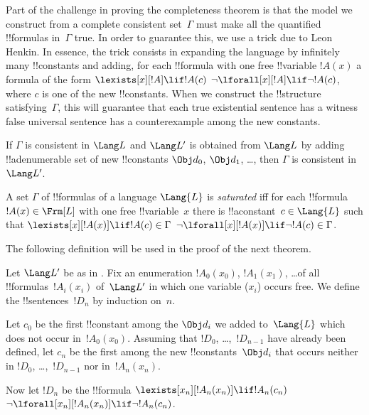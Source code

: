 \documentclass[../../../include/open-logic-section]{subfiles}
\begin{document}


\begin{explain}
Part of the challenge in proving the completeness theorem is that the
model we construct from a complete consistent set~$\Gamma$ must make
all the quantified !!{formula}s in~$\Gamma$ true.  In order to
guarantee this, we use a trick due to Leon Henkin.  In essence, the
trick consists in expanding the language by infinitely many !!{constant}s
and adding, for each !!{formula} with one free !!{variable} $!A(x)$ a
formula of the form
      {$\lexists[x][!A] \lif !A(c)$}
      {$\lnot\lforall[x][!A] \lif \lnot !A(c)$},
where $c$ is one of the new !!{constant}s.  When we construct the
!!{structure} satisfying~$\Gamma$, this will guarantee that each
{true existential sentence has a witness}
{false universal sentence has a counterexample}
among the new constants.
\end{explain}

\begin{prop}
If $\Gamma$ is consistent in $\Lang L$ and $\Lang L'$ is obtained from
$\Lang L$ by adding !!a{denumerable} set of new !!{constant}s $\Obj d_0$,
$\Obj d_1$, \dots, then $\Gamma$ is consistent in~$\Lang L'$.
\end{prop}

\begin{defn}
A set $\Gamma$ of !!{formula}s of a language $\Lang {L}$ is
\emph{saturated} iff for each !!{formula} $!A(x) \in \Frm[L]$ with one
free !!{variable}~$x$ there is !!a{constant}~$c \in \Lang{L}$ such
that
      {$\lexists[x][!A(x)] \lif !A(c) \in \Gamma$}
      {$\lnot\lforall[x][!A(x)] \lif \lnot !A(c) \in \Gamma$}.
\end{defn}

The following definition will be used in the proof of the next theorem.

\begin{defn}
Let $\Lang L'$ be as in .  Fix an enumeration
$!A_0(x_0)$, $!A_1(x_1)$, \dots of all !!{formula}s~$!A_i(x_i)$
of~$\Lang L'$ in which one variable ($x_i$) occurs free.  We define
the !!{sentence}s~$!D_n$ by induction on~$n$.

Let $c_0$ be the first !!{constant} among the $\Obj d_i$ we added
to~$\Lang{L}$ which does not occur in~$!A_0(x_0)$.  Assuming that
$!D_0$, \dots,~$!D_{n-1}$ have already been defined, let $c_n$ be the
first among the new !!{constant}s~$\Obj d_i$ that occurs neither in
$!D_0$, \dots,~$!D_{n-1}$ nor in~$!A_n(x_n)$.

Now let $!D_{n}$ be the !!{formula} 
{$\lexists[x_{n}][!A_{n}(x_{n})] \lif
  !A_{n}(c_{n})$}{$\lnot\lforall[x_{n}][!A_{n}(x_{n})] \lif \lnot
  !A_{n}(c_{n})$}.
\end{defn}
\end{document}
